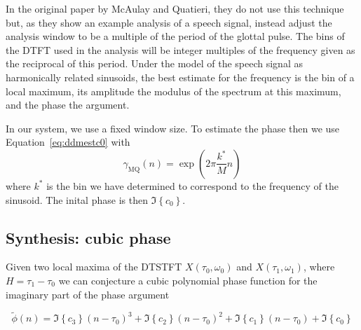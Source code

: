 In the original paper by McAulay and Quatieri, they do not use this technique
but, as they show an example analysis of a speech signal, instead adjust the
analysis window to be a multiple of the period of the glottal pulse. The bins of
the DTFT used in the analysis will be integer multiples of the frequency given
as the reciprocal of this period. Under the model of the speech signal as
harmonically related sinusoids, the best estimate for the frequency is the bin
of a local maximum, its amplitude the modulus of the spectrum at this maximum, and
the phase the argument.

In our system, we use a fixed window size. To estimate the phase then we use
Equation~\ref{eq:ddmestc0} with
\[
    \gamma_{\text{MQ}}(n)=\exp(2\pi\frac{k^{\ast}}{M}n)
\]
where $k^{\ast}$ is the bin we have determined to correspond to the frequency of
the sinusoid. The inital phase is then $\Im \left\{ c_{0} \right\}$.

\subsection{Synthesis: cubic phase \label{sec:S13synthesis}}

Given two local maxima of the
DTSTFT $X(\tau_0,\omega_0)$ and $X(\tau_1,\omega_1)$, where $H = \tau_1 -
\tau_0$ we can conjecture a cubic
polynomial phase function for the imaginary part of the phase argument

\begin{equation}
    \tilde{\phi}(n) = \Im\left\{c_3\right\} (n-\tau_0)^3 + \Im\left\{c_2\right\} (n-\tau_0)^2 + \Im\left\{c_1\right\} (n-\tau_0) + \Im\left\{c_0\right\}
\end{equation}

